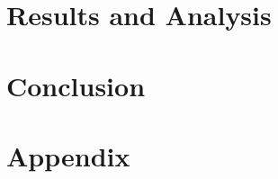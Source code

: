 \documentclass{report}
\begin{document}
\chapter{Results and Analysis}
\newpage

\chapter{Conclusion}

\newpage



\newpage

\chapter{Appendix}
\end{document}
